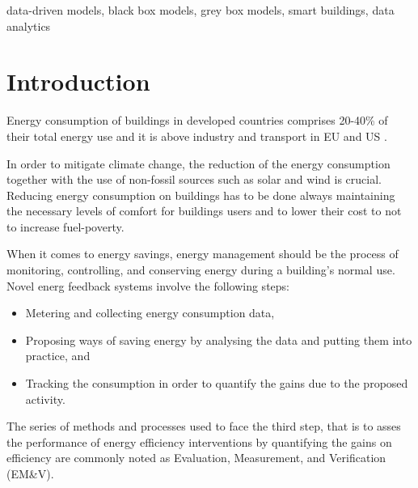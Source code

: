 \documentclass[10pt, conference, compsocconf]{IEEEtran}
\begin{document}
\begin{IEEEkeywords}
data-driven models, black box models, grey box models, smart buildings, data analytics

\end{IEEEkeywords}


%
\IEEEpeerreviewmaketitle



\section{Introduction} \label{intro}

Energy consumption of buildings in developed countries comprises 20-40\% of their total energy use and it is above industry and transport in EU and US \cite{perez2008review}. 

In order to mitigate climate change, the reduction of the energy consumption together with the use of non-fossil sources such as solar and wind is crucial. Reducing energy consumption on buildings has to be done always maintaining the necessary levels of comfort for buildings users and to lower their cost to not to increase fuel-poverty.

When it comes to energy savings, energy management should be the process of monitoring, controlling, and conserving energy during a building's normal use. Novel energ feedback systems involve the following steps:

\begin{itemize}
\item Metering and collecting energy consumption data,
\item Proposing ways of saving energy by analysing the data and putting them into practice, and
\item Tracking the consumption in order to quantify the gains due to the proposed activity.
\end{itemize}


The series of methods and processes used to face the third step, that is to asses the performance of energy efficiency interventions by quantifying the gains on efficiency are commonly noted as Evaluation, Measurement, and Verification (EM\&V). 
\end{document}
